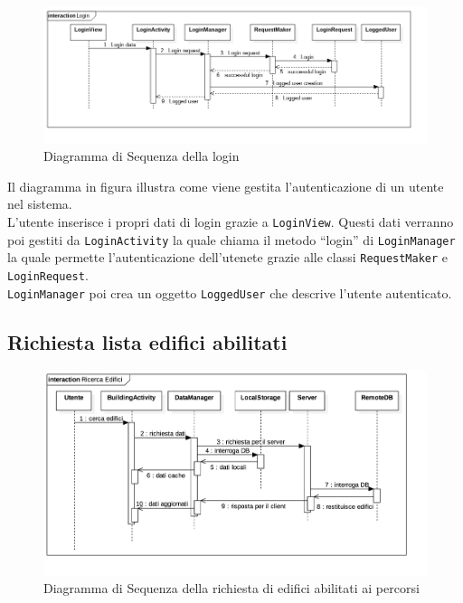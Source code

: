 \begin{figure}[!h]
	\centering
	\includegraphics[scale=0.45]{img/diagrammiSequenza/login}
	\caption{Diagramma di Sequenza della login}
\end{figure}

Il diagramma in figura illustra come viene gestita l'autenticazione di un utente nel sistema. \\
L'utente inserisce i propri dati di login grazie a \texttt{LoginView}. Questi dati verranno poi gestiti da \texttt{LoginActivity} la quale chiama il metodo ``login'' di \texttt{LoginManager} la quale permette l'autenticazione dell'utenete grazie alle classi \texttt{RequestMaker} e \texttt{LoginRequest}. \\
\texttt{LoginManager} poi crea un oggetto \texttt{LoggedUser} che descrive l'utente autenticato.


\subsection{Richiesta lista edifici abilitati}
\label{sub:Richiesta lista edifici abilitati}

\begin{figure}[!h]
	\centering
   \includegraphics[scale=0.28]{img/diagrammiSequenza/ricercaEdifici.png}
   \caption{Diagramma di Sequenza della richiesta di edifici abilitati ai percorsi}
\end{figure}

